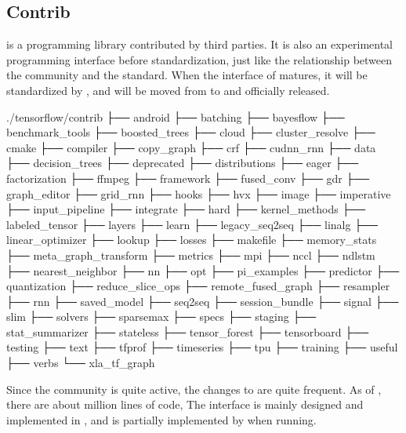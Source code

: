 \begin{content}
\subsection{Contrib}
 is a programming library contributed by third parties. It is also an experimental programming interface before \tf{} standardization, just like the relationship between the  community and the  standard. When the interface of  matures, it will be standardized by \tf{}, and will be moved from  to  and officially released.

\begin{leftbar}
\begin{python}[caption={Contrib source structure}]
./tensorflow/contrib
├── android
├── batching
├── bayesflow
├── benchmark_tools
├── boosted_trees
├── cloud
├── cluster_resolve
├── cmake
├── compiler
├── copy_graph
├── crf
├── cudnn_rnn
├── data
├── decision_trees
├── deprecated
├── distributions
├── eager
├── factorization
├── ffmpeg
├── framework
├── fused_conv
├── gdr
├── graph_editor
├── grid_rnn
├── hooks
├── hvx
├── image
├── imperative
├── input_pipeline
├── integrate
├── hard
├── kernel_methods
├── labeled_tensor
├── layers
├── learn
├── legacy_seq2seq
├── linalg
├── linear_optimizer
├── lookup
├── losses
├── makefile
├── memory_stats
├── meta_graph_transform
├── metrics
├── mpi
├── nccl
├── ndlstm
├── nearest_neighbor
├── nn
├── opt
├── pi_examples
├── predictor
├── quantization
├── reduce_slice_ops
├── remote_fused_graph
├── resampler
├── rnn
├── saved_model
├── seq2seq
├── session_bundle
├── signal
├── slim
├── solvers
├── sparsemax
├── specs
├── staging
├── stat_summarizer
├── stateless
├── tensor_forest
├── tensorboard
├── testing
├── text
├── tfprof
├── timeseries
├── tpu
├── training
├── useful
├── verbs
└── xla_tf_graph
\end{python}
\end{leftbar}

Since the \tf{} community is quite active, the changes to  are quite frequent. As of , there are about  million lines of code,  The interface is mainly designed and implemented in , and is partially implemented by  when running.


\end{content}
